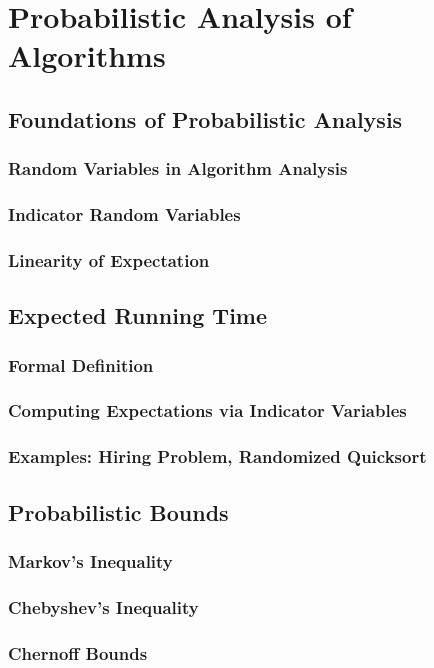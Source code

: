 \chapter{Probabilistic Analysis of Algorithms}
\section{Foundations of Probabilistic Analysis}
\subsection{Random Variables in Algorithm Analysis}
\subsection{Indicator Random Variables}
\subsection{Linearity of Expectation}

\section{Expected Running Time}
\subsection{Formal Definition}
\subsection{Computing Expectations via Indicator Variables}
\subsection{Examples: Hiring Problem, Randomized Quicksort}

\section{Probabilistic Bounds}
\subsection{Markov's Inequality}
\subsection{Chebyshev's Inequality}
\subsection{Chernoff Bounds}
